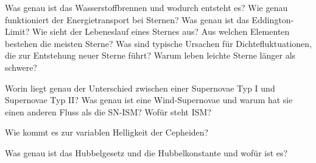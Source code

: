 \begin{frame}{Was genau ist das Wasserstoffbrennen und wodurch entsteht es? Wie genau funktioniert der Energietransport bei Sternen? Was genau ist das Eddington-Limit?   Wie sieht der Lebeneslauf eines Sternes aus?
Aus welchen Elementen bestehen die meisten Sterne?  Was sind typische Ursachen für Dichtefluktuationen, die zur Entstehung neuer Sterne führt? Warum leben leichte Sterne länger als schwere?}
\end{frame}

\begin{frame}{Worin liegt genau der Unterschied zwischen einer Supernovae Typ I und Supernovae Typ II?
Was genau ist eine Wind-Supernovae und warum hat sie einen anderen Fluss als die SN-ISM? Wofür steht ISM?}
\end{frame}

\begin{frame}{Wie kommt es zur variablen Helligkeit der Cepheiden?}
\end{frame}

\begin{frame}{Was genau ist das Hubbelgesetz und die Hubbelkonstante und wofür ist es?}
\end{frame}
